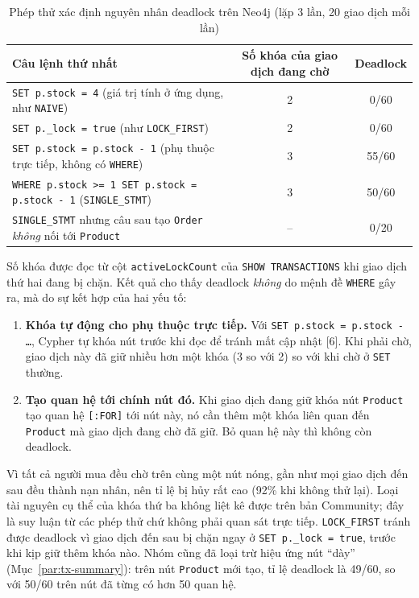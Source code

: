 \begin{table}[htbp]
\centering
\caption{Phép thử xác định nguyên nhân deadlock trên Neo4j (lặp 3 lần, 20 giao dịch mỗi lần)}
\label{tab:tx-deadlock-probe}
\renewcommand{\arraystretch}{1.2}
\begin{tabularx}{\textwidth}{X c c}
\toprule
\textbf{Câu lệnh thứ nhất} & \textbf{Số khóa của giao dịch đang chờ} & \textbf{Deadlock} \\
\midrule
\texttt{SET p.stock = 4} (giá trị tính ở ứng dụng, như \texttt{NAIVE}) & 2 & 0/60 \\
\texttt{SET p.\_lock = true} (như \texttt{LOCK\_FIRST}) & 2 & 0/60 \\
\texttt{SET p.stock = p.stock - 1} (phụ thuộc trực tiếp, không có \texttt{WHERE}) & 3 & 55/60 \\
\texttt{WHERE p.stock >= 1 SET p.stock = p.stock - 1} (\texttt{SINGLE\_STMT}) & 3 & 50/60 \\
\texttt{SINGLE\_STMT} nhưng câu sau tạo \texttt{Order} \emph{không} nối tới \texttt{Product} & -- & 0/20 \\
\bottomrule
\end{tabularx}
\end{table}

Số khóa được đọc từ cột \texttt{activeLockCount} của \texttt{SHOW TRANSACTIONS} khi giao dịch thứ hai đang bị chặn. Kết quả cho thấy deadlock \emph{không} do mệnh đề \texttt{WHERE} gây ra, mà do sự kết hợp của hai yếu tố:
\begin{enumerate}
    \item \textbf{Khóa tự động cho phụ thuộc trực tiếp.} Với \texttt{SET p.stock = p.stock - \ldots}, Cypher tự khóa nút trước khi đọc để tránh mất cập nhật [6]. Khi phải chờ, giao dịch này đã giữ nhiều hơn một khóa (3 so với 2) so với khi chờ ở \texttt{SET} thường.
    \item \textbf{Tạo quan hệ tới chính nút đó.} Khi giao dịch đang giữ khóa nút \texttt{Product} tạo quan hệ \texttt{[:FOR]} tới nút này, nó cần thêm một khóa liên quan đến \texttt{Product} mà giao dịch đang chờ đã giữ. Bỏ quan hệ này thì không còn deadlock.
\end{enumerate}
Vì tất cả người mua đều chờ trên cùng một nút nóng, gần như mọi giao dịch đến sau đều thành nạn nhân, nên tỉ lệ bị hủy rất cao (92\% khi không thử lại). Loại tài nguyên cụ thể của khóa thứ ba không liệt kê được trên bản Community; đây là suy luận từ các phép thử chứ không phải quan sát trực tiếp. \texttt{LOCK\_FIRST} tránh được deadlock vì giao dịch đến sau bị chặn ngay ở \texttt{SET p.\_lock = true}, trước khi kịp giữ thêm khóa nào. Nhóm cũng đã loại trừ hiệu ứng nút ``dày'' (Mục~\ref{par:tx-summary}): trên nút \texttt{Product} mới tạo, tỉ lệ deadlock là 49/60, so với 50/60 trên nút đã từng có hơn 50 quan hệ.


